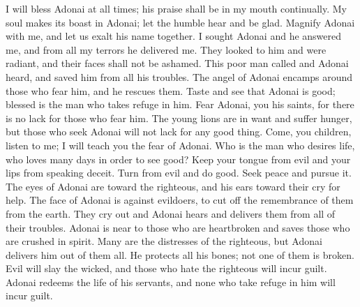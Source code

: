 \begin{biblechapter} %
 I will bless Adonai at all times; 
his praise shall be in my mouth continually.
\verse My soul makes its boast in Adonai; 
let the humble hear and be glad.
\verse Magnify Adonai with me, 
and let us exalt his name together.
\verse I sought Adonai and he answered me, 
and from all my terrors he delivered me.
\verse They looked to him and were radiant, 
and their faces shall not be ashamed.
\verse This poor man called and Adonai heard, 
and saved him from all his troubles.
\verse The angel of Adonai encamps 
around those who fear him, 
and he rescues them.
\verse Taste and see that Adonai is good; 
blessed is the man who takes refuge in him.
\verse Fear Adonai, you his saints, 
for there is no lack for those who fear him.
\verse The young lions are in want and suffer hunger, 
but those who seek Adonai will not lack for any good thing.
\verse Come, you children, listen to me; 
I will teach you the fear of Adonai.
\verse Who is the man who desires life, 
who loves many days in order to see good?
\verse Keep your tongue from evil 
and your lips from speaking deceit.
\verse Turn from evil and do good. 
Seek peace and pursue it.
\verse The eyes of Adonai are toward the righteous, 
and his ears toward their cry for help.
\verse The face of Adonai is against evildoers, 
to cut off the remembrance of them from the earth.
\verse They cry out and Adonai hears 
and delivers them from all of their troubles.
\verse Adonai is near to those who are heartbroken 
and saves those who are crushed in spirit.
\verse Many are the distresses of the righteous, 
but Adonai delivers him out of them all.
\verse He protects all his bones; 
not one of them is broken.
\verse Evil will slay the wicked, 
and those who hate the righteous will incur guilt.
\verse Adonai redeems the life of his servants, 
and none who take refuge in him will incur guilt.
\end{biblechapter}

